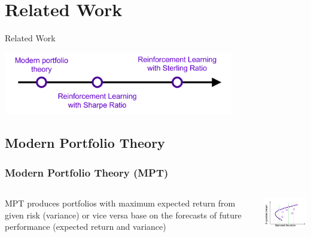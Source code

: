 \section{Related Work}

\begin{frame}{Related Work}
       \tableofcontents[sectionstyle=show/hide, hideothersubsections]
    \begin{center}
    \includegraphics[width=10cm]{images/related.png}
    \end{center}
\end{frame}

\subsection{Modern Portfolio Theory}
\begin{frame}
\frametitle{Modern Portfolio Theory (MPT)}
\begin{columns}
\begin{column}{0.55\textwidth}
MPT produces portfolios with maximum expected return from given risk (variance) or vice versa base on the forecasts of future performance (expected return and variance)
\end{column}
\begin{column}{0.45\textwidth}
\begin{center}
\includegraphics[width=4.8cm]{images/mpt_risk.png}
\end{center}
\end{column}
\end{columns}
\end{frame}


